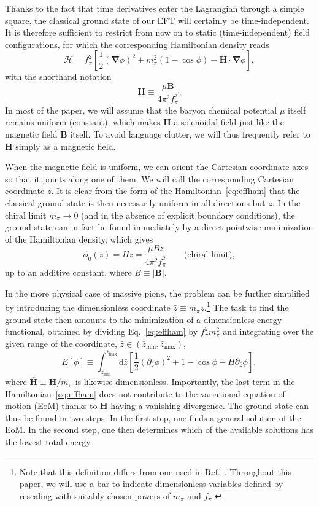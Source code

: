 \documentclass[pdflatex,iicol,sn-mathphys-num]{sn-jnl}
\let\m=\mu
\let\p=\phi
\let\de=\partial
\newcommand{\Ha}{\mathscr{H}}%
\newcommand{\dd}{\text{d}}%
\newcommand{\vek}[1]{\bm{#1}}%
\newcommand{\grad}{\vek\nabla}%
\begin{document}
Thanks to the fact that time derivatives enter the Lagrangian through a simple square, the classical ground state of our EFT will certainly be time-independent. It is therefore sufficient to restrict from now on to static (time-independent) field configurations, for which the corresponding Hamiltonian density reads
\begin{equation}
\Ha=f_\pi^2\left[\frac12(\grad\p)^2+m_\pi^2(1-\cos\p)-\vek H\cdot\grad\p\right],
\label{eq:effham}
\end{equation}
with the shorthand notation
\begin{equation}
\vek H\equiv\frac{\m\vek B}{4\pi^2f_\pi^2}.
\label{eq:defH}
\end{equation}
In most of the paper, we will assume that the baryon chemical potential $\m$ itself remains uniform (constant), which makes $\vek H$ a solenoidal field just like the magnetic field $\vek B$ itself. To avoid language clutter, we will thus frequently refer to $\vek H$ simply as a magnetic field.

When the magnetic field is uniform, we can orient the Cartesian coordinate axes so that it points along one of them. We will call the corresponding Cartesian coordinate $z$. It is clear from the form of the Hamiltonian~\eqref{eq:effham} that the classical ground state is then necessarily uniform in all directions but $z$. In the chiral limit $m_\pi\to0$ (and in the absence of explicit boundary conditions), the ground state can in fact be found immediately by a direct pointwise minimization of the Hamiltonian density, which gives
\begin{equation}
\p_0(z)=Hz=\frac{\m Bz}{4\pi^2f_\pi^2}\qquad\text{(chiral limit)},
\label{eq:vacuniformchiral}
\end{equation}
up to an additive constant, where $B\equiv|\vek B|$.

In the more physical case of massive pions, the problem can be further simplified by introducing the dimensionless coordinate $\bar z\equiv m_\pi z$.\footnote{Note that this definition differs from one used in Ref.~\cite{Brauner:2016pko}. Throughout this paper, we will use a bar to indicate dimensionless variables defined by rescaling with suitably chosen powers of $m_\pi$ and $f_\pi$.} The task to find the ground state then amounts to the minimization of a dimensionless energy functional, obtained by dividing Eq.~\eqref{eq:effham} by $f_\pi^2m_\pi^2$ and integrating over the given range of the coordinate, $\bar z\in(\bar z_\text{min},\bar z_\text{max})$,
\begin{equation}
\bar E[\p]\equiv\int_{\bar z_\text{min}}^{\bar z_\text{max}}\dd\bar z\left[\frac12(\de_{\bar z}\p)^2+1-\cos\p-\bar H\de_{\bar z}\p\right],
\label{eq:dimlessE}
\end{equation}
where $\bar{\vek H}\equiv\vek H/m_\pi$ is likewise dimensionless. Importantly, the last term in the Hamiltonian~\eqref{eq:effham} does not contribute to the variational equation of motion (EoM) thanks to $\vek H$ having a vanishing divergence. The ground state can thus be found in two steps. In the first step, one finds a general solution of the EoM. In the second step, one then determines which of the available solutions has the lowest total energy.
\end{document}
